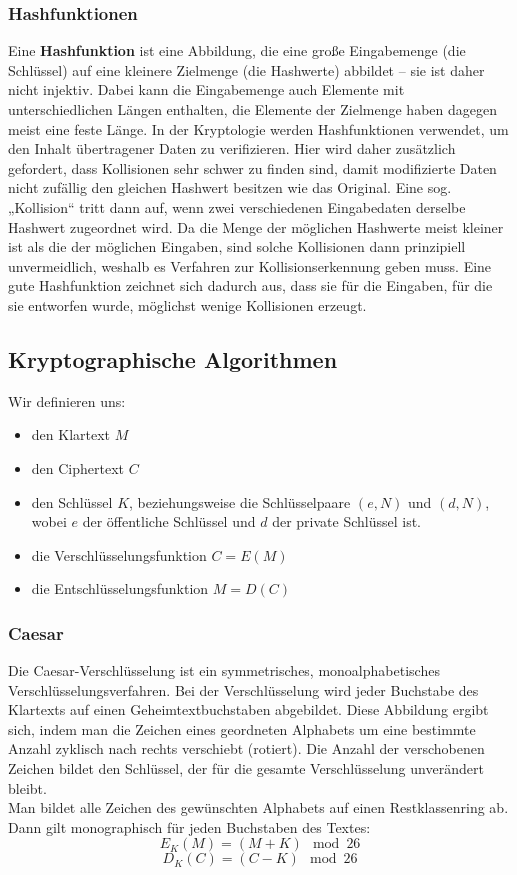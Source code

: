 \documentclass[a4paper,10pt,DIV9, BCOR12mm, oneside,openright,openbib]{scrreprt}
\theoremstyle{definition}
\theoremstyle{plain}
\begin{document}
\subsubsection{Hashfunktionen}
Eine \textbf{Hashfunktion} ist eine Abbildung, die eine große Eingabemenge (die Schlüssel) auf eine kleinere Zielmenge (die Hashwerte) abbildet – sie ist daher nicht injektiv. Dabei kann die Eingabemenge auch Elemente mit unterschiedlichen Längen enthalten, die Elemente der Zielmenge haben dagegen meist eine feste Länge. In der Kryptologie werden Hashfunktionen verwendet, um den Inhalt übertragener Daten zu verifizieren. Hier wird daher zusätzlich gefordert, dass Kollisionen sehr schwer zu finden sind, damit modifizierte Daten nicht zufällig den gleichen Hashwert besitzen wie das Original. Eine sog. „Kollision“ tritt dann auf, wenn zwei verschiedenen Eingabedaten derselbe Hashwert zugeordnet wird. Da die Menge der möglichen Hashwerte meist kleiner ist als die der möglichen Eingaben, sind solche Kollisionen dann prinzipiell unvermeidlich, weshalb es Verfahren zur Kollisionserkennung geben muss. Eine gute Hashfunktion zeichnet sich dadurch aus, dass sie für die Eingaben, für die sie entworfen wurde, möglichst wenige Kollisionen erzeugt.

\subsection{Kryptographische Algorithmen}
Wir definieren uns:
\begin{itemize}
 \item den Klartext $M$
 \item den Ciphertext $C$
 \item den Schlüssel $K$, beziehungsweise die Schlüsselpaare $(e,N)$ und $(d,N)$, wobei $e$ der öffentliche Schlüssel und $d$ der private Schlüssel ist.
 \item die Verschlüsselungsfunktion $C = E(M)$
 \item die Entschlüsselungsfunktion $M = D(C)$
\end{itemize}

\subsubsection{Caesar}
Die Caesar-Verschlüsselung ist ein symmetrisches, monoalphabetisches Verschlüsselungsverfahren. Bei der Verschlüsselung wird jeder Buchstabe des Klartexts auf einen Geheimtextbuchstaben abgebildet. Diese Abbildung ergibt sich, indem man die Zeichen eines geordneten Alphabets um eine bestimmte Anzahl zyklisch nach rechts verschiebt (rotiert). Die Anzahl der verschobenen Zeichen bildet den Schlüssel, der für die gesamte Verschlüsselung unverändert bleibt. \\
Man bildet alle Zeichen des gewünschten Alphabets auf einen Restklassenring ab. Dann gilt monographisch für jeden Buchstaben des Textes:
\[E_{K}(M) = (M+K) \mod{26}\]
\[D_{K}(C) = (C-K) \mod{26}\]
\end{document}
